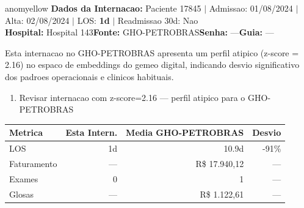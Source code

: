 \documentclass[a4paper,10pt]{article}
\begin{document}
\begin{anomalycard}[Internacao 100080 | GHO-PETROBRAS | MODERADO (z=2.16)]{anomyellow}
\textbf{Dados da Internacao:} Paciente 17845 $\mid$ Admissao: 01/08/2024 $\mid$ Alta: 02/08/2024 $\mid$ LOS: \textbf{1d} $\mid$ Readmissao 30d: Nao\\
\textbf{Hospital:} Hospital 143\quad\textbf{Fonte:} GHO-PETROBRAS\quad\textbf{Senha:} ---\quad\textbf{Guia:} ---\\
\vspace{2pt}\begin{tcolorbox}[colback=severityred!20,colframe=anomyellow,title={\textbf{Interpretacao de Negocio}},fonttitle=\bfseries\small,left=4pt,right=4pt,top=3pt,bottom=3pt]
{\small Esta internacao no GHO-PETROBRAS apresenta um perfil atipico (z-score = 2.16) no espaco de embeddings do gemeo digital, indicando desvio significativo dos padroes operacionais e clinicos habituais.}
\end{tcolorbox}
\begin{tcolorbox}[colback=severityyellow!30,colframe=anomorange,title={\textbf{Recomendacoes Especificas}},fonttitle=\bfseries\small,left=4pt,right=4pt,top=3pt,bottom=3pt]
\begin{enumerate}[nosep,leftmargin=16pt]
\item {\small Revisar internacao com z-score=2.16 --- perfil atipico para o GHO-PETROBRAS}
\end{enumerate}
\end{tcolorbox}
\begin{center}\begin{tabular}{l r r r}\toprule\textbf{Metrica} & \textbf{Esta Intern.} & \textbf{Media GHO-PETROBRAS} & \textbf{Desvio} \\\midrule
LOS & 1d & 10.9d & -91\% \\
Faturamento & --- & R\$ 17.940,12 & --- \\
Exames & 0 & 1 & --- \\
Glosas & --- & R\$ 1.122,61 & --- \\
\bottomrule\end{tabular}\end{center}


\end{anomalycard}
\end{document}
